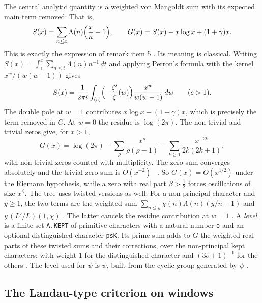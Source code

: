 The central analytic quantity is a weighted von Mangoldt sum with its expected main term removed:
\noindent That is,
\[
  S(x)=\sum_{n\le x}\Lambda(n)\Bigl(\frac{x}{n}-1\Bigr),\qquad
  G(x)=S(x)-x\log x+(1+\gamma)x .
\]
This is exactly the expression of remark item 5 . Its meaning is classical. Writing
$S(x)=\int_1^x\sum_{n\le t}\Lambda(n)n^{-1}\,dt$ and applying Perron's formula with the kernel
$x^{w}/(w(w-1))$ gives
\[
  S(x)=\frac1{2\pi i}\int_{(c)}\Bigl(-\frac{\zeta'}{\zeta}(w)\Bigr)\frac{x^{w}}{w(w-1)}\,dw\qquad(c>1).
\]
The double pole at $w=1$ contributes $x\log x-(1+\gamma)x$, which is precisely the term removed in
$G$. At $w=0$ the residue is $\log(2\pi)$. The non-trivial and trivial zeros give, for $x>1$,
\[
  G(x)=\log(2\pi)-\sum_{\rho}\frac{x^{\rho}}{\rho(\rho-1)}-\sum_{k\ge1}\frac{x^{-2k}}{2k(2k+1)},
\]
with non-trivial zeros counted with multiplicity. The zero sum converges absolutely and the
trivial-zero sum is $O(x^{-2})$ \stcs~\cite[Ch.~17]{davenport}\cite[Ch.~5]{iwaniec-kowalski}.
So $G(x)=O(x^{1/2})$ under the Riemann hypothesis, while a zero with real part $\beta>\frac12$
forces oscillations of size $x^{\beta}$. The tree uses twisted versions as well:
\noindent For a non-principal character and $y\ge1$, the two terms are the weighted sum
$\sum_{n\le y}\chi(n)\Lambda(n)(y/n-1)$ and $y\,(L'/L)(1,\chi)$
.
The latter cancels the residue contribution at $w=1$ \sti. A \emph{level} 
is a finite set \texttt{Λ.KEPT} of primitive characters with a natural number \texttt{o} and an
optional distinguished character \texttt{psK}. Its prime sum adds to $G$ the weighted real parts of
these twisted sums and their corrections, over the non-principal kept characters:
\noindent with weight $1$ for the distinguished character and $(3o+1)^{-1}$ for the others
.
The level used for $\psi$ is  $\psi$, built from the cyclic group
generated by $\psi$ .

\subsection{The Landau-type criterion on windows}

